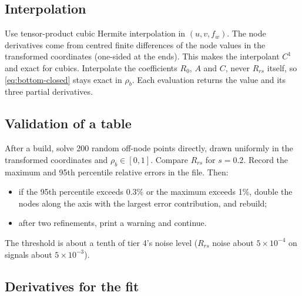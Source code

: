 \documentclass[11pt]{article}
\numberwithin{equation}{section}
\begin{document}
\subsection{Interpolation}\label{sec:interp}

Use tensor-product cubic Hermite interpolation in $(u,v,f_w)$. The node derivatives come from
centred finite differences of the node values in the transformed coordinates (one-sided at the
ends). This makes the interpolant $C^1$ and exact for cubics. Interpolate the coefficients
$R_0$, $A$ and $C$, never $R_{rs}$ itself, so \eqref{eq:bottom-closed} stays exact in $\rho_b$.
Each evaluation returns the value and its three partial derivatives.

\subsection{Validation of a table}

After a build, solve 200 random off-node points directly, drawn uniformly in the transformed
coordinates and $\rho_b\in[0,1]$. Compare $R_{rs}$ for $s = 0.2$. Record the maximum and 95th
percentile relative errors in the file. Then:
\begin{itemize}
\item if the 95th percentile exceeds 0.3\% or the maximum exceeds 1\%, double the nodes along
the axis with the largest error contribution, and rebuild;
\item after two refinements, print a warning and continue.
\end{itemize}
The threshold is about a tenth of tier 4's noise level ($R_{rs}$ noise about $5\times10^{-4}$
on signals about $5\times10^{-3}$).

\subsection{Derivatives for the fit}\label{sec:jacobian}
\end{document}
